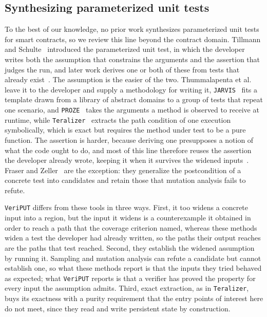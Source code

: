 \documentclass[manuscript,anonymous]{acmart}
\newcommand{\tool}[1]{\texttt{#1}}
\begin{document}
\subsection{Synthesizing parameterized unit tests}\label{sec:rw-put}

To the best of our knowledge, no prior work synthesizes parameterized unit
tests for smart contracts, so we review this line beyond the contract domain.
Tillmann and Schulte~\cite{Tillmann2005} introduced the parameterized unit
test, in which the developer writes both the assumption that constrains the
arguments and the assertion that judges the run, and later work derives one or
both of these from tests that already exist~\cite{Danglot2019}. The assumption
is the easier of the two. Thummalapenta et al.~\cite{Thummalapenta2011} leave it
to the developer and supply a methodology for writing it,
\tool{JARVIS}~\cite{Peleg2018Jarvis} fits a template drawn from a library of
abstract domains to a group of tests that repeat one scenario, and
\tool{PROZE}~\cite{Proze2024} takes the arguments a method is observed to
receive at runtime, while \tool{Teralizer}~\cite{Glock2025} extracts the path
condition of one execution symbolically, which is exact but requires the method
under test to be a pure function. The assertion is harder, because deriving one
presupposes a notion of what the code ought to do, and most of this line
therefore reuses the assertion the developer already wrote, keeping it when it
survives the widened inputs~\cite{Peleg2018Jarvis,Proze2024}. Fraser and
Zeller~\cite{FraserZeller2011} are the exception: they generalize the
postcondition of a concrete test into candidates and retain those that mutation
analysis fails to refute.

\tool{VeriPUT} differs from these tools in three ways. First, it too widens a
concrete input into a region, but the input it widens is a counterexample it
obtained in order to reach a path that the coverage criterion named, whereas
these methods widen a test the developer had already written, so the paths their
output reaches are the paths that test reached. Second, they establish the
widened assumption by running it. Sampling and mutation analysis can refute a
candidate but cannot establish one, so what these methods report is that the
inputs they tried behaved as expected; what \tool{VeriPUT} reports is that a
verifier has proved the property for every input the assumption admits. Third,
exact extraction, as in \tool{Teralizer}, buys its exactness with a purity
requirement that the entry points of interest here do not meet, since they read
and write persistent state by construction.
\end{document}
